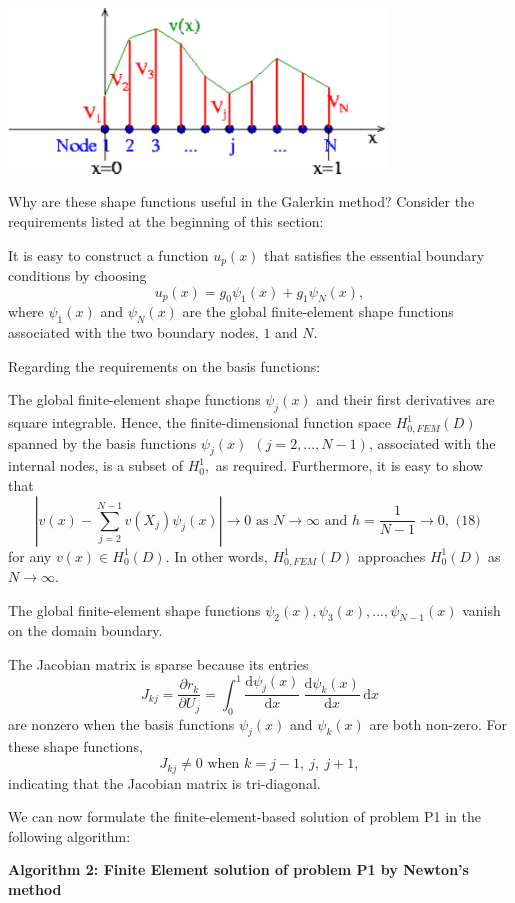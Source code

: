  
\begin{DoxyImage}
\includegraphics[width=0.75\textwidth]{fe_is_interpolant}
\caption{The superposition of the (global) linear finite-\/element shape functions provides a piecewise linear interpolation between the `nodal values'. }
\end{DoxyImage}


Why are these shape functions useful in the Galerkin method? Consider the requirements listed at the beginning of this section\-:
\begin{DoxyEnumerate}
\item It is easy to construct a function $ u_p(x) $ that satisfies the essential boundary conditions by choosing \[ u_p(x) = g_0 \psi_1(x) + g_1 \psi_N(x), \] where $ \psi_1(x) $ and $ \psi_N(x) $ are the global finite-\/element shape functions associated with the two boundary nodes, $1$ and $N$.
\item Regarding the requirements on the basis functions\-:
\begin{DoxyEnumerate}
\item The global finite-\/element shape functions $ \psi_j(x) $ and their first derivatives are square integrable. Hence, the finite-\/dimensional function space $ H^1_{0,FEM}(D) $ spanned by the basis functions $ \psi_j(x) \ \ (j=2,...,N-1)$, associated with the internal nodes, is a subset of $ H^1_0,$ as required. Furthermore, it is easy to show that \[ \left| v(x) - \sum_{j=2}^{N-1} v(X_j) \psi_j(x) \right| \to 0 \mbox{\ \ \ as $N\to\infty$ and $h=\frac{1}{N-1} \to 0,$ \ \ \ \ \ \ \ (18) } \] for any $ v(x) \in H^1_0(D) $. In other words, $ H^1_{0,FEM}(D) $ approaches $ H^1_0(D) $ as $ N \to \infty. $
\item The global finite-\/element shape functions $ \psi_2(x), \psi_3(x),...,\psi_{N-1}(x) $ vanish on the domain boundary.
\item The Jacobian matrix is sparse because its entries \[ J_{kj} = \frac{\partial r_k}{\partial U_j} = \int_0^1 \frac{\mbox{d} \psi_j(x)}{\mbox{d} x} \ \frac{\mbox{d} \psi_k(x)}{\mbox{d} x} \, \mbox{d}x \] are nonzero when the basis functions $ \psi_j(x) $ and $ \psi_k(x) $ are both non-\/zero. For these shape functions, \[ J_{kj} \ne 0 \mbox{\ \ \ \ when \ \ $k=j-1,\ j, \ j+1,$} \] indicating that the Jacobian matrix is tri-\/diagonal.
\end{DoxyEnumerate}
\end{DoxyEnumerate}We can now formulate the finite-\/element-\/based solution of problem P1 in the following algorithm\-: \begin{center} {\bfseries  Algorithm 2\-: Finite Element solution of problem P1 by Newton's method} \end{center} 

